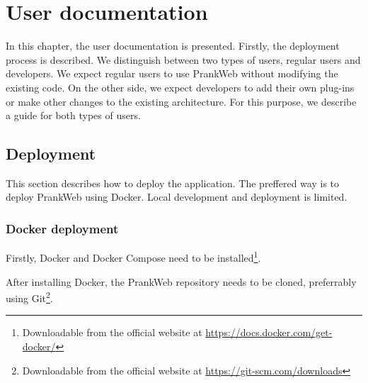 \chapter{User documentation}
\label{chap:user_docs}

In this chapter, the user documentation is presented. Firstly, the deployment process is described. We distinguish between two types of users, regular users and developers. We expect regular users to use PrankWeb without modifying the existing code. On the other side, we expect developers to add their own plug-ins or make other changes to the existing architecture. For this purpose, we describe a guide for both types of users.


\section{Deployment}
\label{sec:deployment}

This section describes how to deploy the application. The preffered way is to deploy PrankWeb using Docker. Local development and deployment is limited.

\subsection{Docker deployment}
\label{subsec:docker_deployment}

Firstly, Docker and Docker Compose need to be installed\footnote{Downloadable from the official website at \url{https://docs.docker.com/get-docker/}}. 

After installing Docker, the PrankWeb repository needs to be cloned, preferrably using Git\footnote{Downloadable from the official website at \url{https://git-scm.com/downloads}}.

